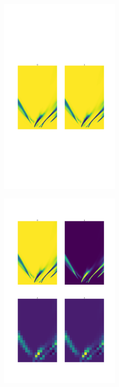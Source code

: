  \begin{figure}[h]
      \caption{Activation maps of convolutional layers (a) embedding pathway (b) regression pathway, while training them simultaneously}
        \centering
        \begin{subfigure}{0.8\textwidth}
        \includegraphics[width=1\linewidth, height=10cm]{images/activation_embededing_nofix.png} 
        \caption{}
        \label{fig:subim1}
        \end{subfigure}
        \begin{subfigure}{0.8\textwidth}
        \includegraphics[width=1\linewidth,height=10cm]{images/embedding_regression_nofix.png}
        \caption{}
        \label{fig:subim2}
        \end{subfigure}
        \end{figure}

